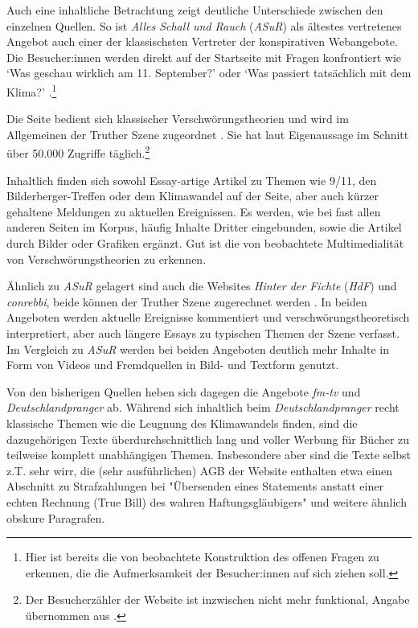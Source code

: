 Auch eine inhaltliche Betrachtung zeigt deutliche Unterschiede zwischen den einzelnen Quellen.
So ist \textit{Alles Schall und Rauch} (\textit{ASuR}) als ältestes vertretenes Angebot auch einer der klassischsten Vertreter der konspirativen Webangebote.
Die Besucher:innen werden direkt auf der Startseite mit Fragen konfrontiert wie \enquote*{Was geschau wirklich am 11. September?} oder \enquote*{Was passiert tatsächlich mit dem Klima?} \parencite{asur-homepage}.\footnote{Hier ist bereits die von \textcite[][205]{filatkina_2018} beobachtete Konstruktion des offenen Fragen zu erkennen, die die Aufmerksamkeit der Besucher:innen auf sich ziehen soll.}

Die Seite bedient sich klassischer Verschwörungstheorien und wird im Allgemeinen der Truther Szene zugeordnet \parencite{psiram-asur}.
Sie hat laut Eigenaussage im Schnitt über 50.000 Zugriffe täglich.\footnote{Der Besucherzähler der Website ist inzwischen nicht mehr funktional, Angabe übernommen aus \textcite{vice-asur}.}

Inhaltlich finden sich sowohl Essay-artige Artikel zu Themen wie 9/11, den Bilderberger-Treffen oder dem Klimawandel auf der Seite, aber auch kürzer gehaltene Meldungen zu aktuellen Ereignissen.
Es werden, wie bei fast allen anderen Seiten im Korpus, häufig Inhalte Dritter eingebunden, sowie die Artikel durch Bilder oder Grafiken ergänzt.
Gut ist die von \textcite{soukup_2008} beobachtete Multimedialität von Verschwörungstheorien zu erkennen.

Ähnlich zu \textit{ASuR} gelagert sind auch die Websites \textit{Hinter der Fichte} (\textit{HdF}) und \textit{conrebbi}, beide können der Truther Szene zugerechnet werden \parencite[vgl.][]{psiram-conrebbi}.
In beiden Angeboten werden aktuelle Ereignisse kommentiert und verschwörungstheoretisch interpretiert, aber auch längere Essays zu typischen Themen der Szene verfasst.
Im Vergleich zu \textit{ASuR} werden bei beiden Angeboten deutlich mehr Inhalte in Form von Videos und Fremdquellen in Bild- und Textform genutzt.

Von den bisherigen Quellen heben sich dagegen die Angebote \textit{fm-tv} und \textit{Deutschlandpranger} ab.
Während sich inhaltlich beim \textit{Deutschlandpranger} recht klassische Themen wie die Leugnung des Klimawandels \parencite*[vgl.][]{dprang-klima} finden, sind die dazugehörigen Texte überdurchschnittlich lang und voller Werbung für Bücher zu teilweise komplett unabhängigen Themen.
Insbesondere aber sind die Texte selbst z.T. sehr wirr, die (sehr ausführlichen) AGB der Website enthalten etwa einen Abschnitt zu Strafzahlungen bei "Übersenden eines Statements anstatt einer echten Rechnung (True Bill) des wahren Haftungsgläubigers" \parencite{dprang-agb} und weitere ähnlich obskure Paragrafen.

